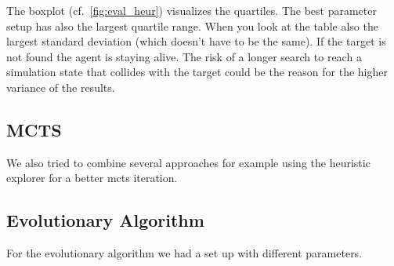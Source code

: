 The boxplot (cf.~\cref{fig:eval_heur}) visualizes the quartiles. The best parameter setup has also the largest
quartile range. When you look at the table also the largest standard deviation (which doesn't have to be the same).
If the target is not found the agent is staying alive. The risk of a longer search to reach a simulation state
that collides with the target could be the reason for the higher variance of the results.



\subsection{MCTS} 
We also tried to combine several approaches for example using the heuristic explorer 
for a better mcts iteration. 


\subsection{Evolutionary Algorithm} 

For the evolutionary algorithm we had a set up with different parameters.

